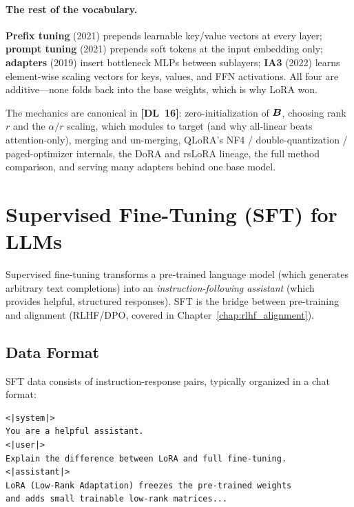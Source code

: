 \paragraph{The rest of the vocabulary.}
\textbf{Prefix tuning}\label{sec:prefix-tuning} (2021) prepends learnable
key/value vectors at every layer; \textbf{prompt
tuning}\label{sec:prompt-tuning} (2021) prepends soft tokens at the input
embedding only; \textbf{adapters}\label{sec:adapters} (2019) insert bottleneck
MLPs between sublayers; \textbf{IA3}\label{sec:ia3} (2022) learns element-wise
scaling vectors for keys, values, and FFN activations.  All four are
additive---none folds back into the base weights, which is why LoRA won.

\begin{keyinsight}
The mechanics are canonical in \textbf{[DL~16]}: zero-initialization of $\bm{B}$,
choosing rank $r$ and the $\alpha/r$ scaling, which modules to target (and why
all-linear beats attention-only), merging and un-merging, QLoRA's NF4 /
double-quantization / paged-optimizer internals, the DoRA and rsLoRA lineage,
the full method comparison, and serving many adapters behind one base model.
\end{keyinsight}

\section{Supervised Fine-Tuning (SFT) for LLMs}
\label{sec:sft}

Supervised fine-tuning transforms a pre-trained language model (which generates
arbitrary text completions) into an \emph{instruction-following assistant}
(which provides helpful, structured responses).  SFT is the bridge between
pre-training and alignment (RLHF/DPO, covered in Chapter~\ref{chap:rlhf_alignment}).

\subsection{Data Format}

SFT data consists of instruction-response pairs, typically organized in a chat
format:

\begin{lstlisting}[language={}, caption={Typical SFT training example (ChatML format)}]
<|system|>
You are a helpful assistant.
<|user|>
Explain the difference between LoRA and full fine-tuning.
<|assistant|>
LoRA (Low-Rank Adaptation) freezes the pre-trained weights
and adds small trainable low-rank matrices...
\end{lstlisting}

